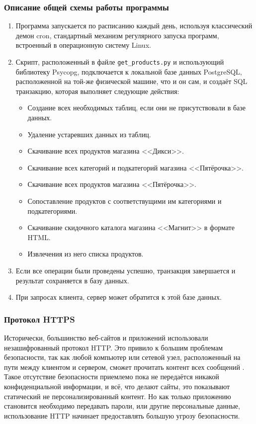 \documentclass[a4paper,12pt]{article}
\begin{document}
  \subsubsection{Описание общей схемы работы программы}
  \begin{enumerate}
    \item Программа запускается по расписанию каждый день, используя классический демон cron, стандартный механизм регулярного запуска программ, встроенный в операционную систему Linux.
    \item Скрипт, расположенный в файле \texttt{get\_products.py} и использующий библиотеку Psycopg,
      подключается к локальной базе данных PostgreSQL, расположенной на той-же физической машине, что и он сам,
      и создаёт SQL транзакцию, которая выполняет следующие действия:
    \begin{itemize}
      \item Создание всех необходимых таблиц, если они не присутствовали в базе данных.
      \item Удаление устаревших данных из таблиц.
      \item Скачивание всех продуктов магазина <<Дикси>>.
      \item Скачивание всех категорий и подкатегорий магазина <<Пятёрочка>>.
      \item Скачивание всех продуктов магазина <<Пятёрочка>>.
      \item Сопоставление продуктов с соответствущими им категориями и подкатегориями.
      \item Скачивание скидочного каталога магазина <<Магнит>> в формате HTML.
      \item Извлечения из него списка продуктов.
    \end{itemize}
    \item Если все операции были проведены успешно, транзакция завершается и результат сохраняется в базу данных.
    \item При запросах клиента, сервер может обратится к этой базе данных.
  \end{enumerate}

  \subsubsection{Протокол HTTPS}
  \label{sec:https}
  Исторически, большинство веб-сайтов и приложений использовали незашифрованный протокол HTTP.
  Это привило к большим проблемам безопасности, так как любой компьютер или сетевой узел, расположенный на пути между клиентом и сервером,
  сможет прочитать контент всех сообщений \cite{https}.
  Такое отсутствие безопасности приемлемо пока не передаётся никакой конфиденциальной информации,
  и всё, что делают сайты, это показывают статический не персонализированный контент.
  Но как только приложению становится необходимо передавать пароли, или другие персональные данные,
  использование HTTP начинает предоставлять большую угрозу безопасности.
\end{document}
